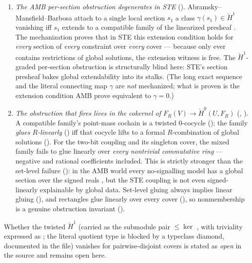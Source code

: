 \documentclass[11pt]{article}
\newcommand{\Hech}{\check H}
\begin{document}
\begin{enumerate}
\item \emph{The AMB per-section obstruction degenerates in STE}
  ().  Abramsky--Mansfield--Barbosa attach
  to a single local section $s_1$ a class $\gamma(s_1) \in \Hech^1$
  vanishing iff $s_1$ extends to a compatible family of the
  linearized presheaf \citep[Prop.~4.2]{abramsky2012cohomology}.  The
  mechanization proves that in STE this extension condition holds for
  \emph{every} section of \emph{every} constraint over \emph{every}
  cover --- because  only ever contains
  restrictions of global solutions, the extension witness is free.
  The $\Hech^1$-graded per-section obstruction is structurally blind
  here: STE's section presheaf bakes global extendability into its
  stalks.  (The long exact sequence and the literal connecting map
  $\gamma$ are \emph{not} mechanized; what is proven is the extension
  condition AMB prove equivalent to $\gamma = 0$.)
\item \emph{The obstruction that fires lives in the cokernel of
  $F_R(V) \to \Hech^0(U, F_R)$}
  (,
  ).  A compatible
  family's point-mass cochain is a twisted $0$-cocycle
  (); the family \emph{glues
  $R$-linearly} () iff that cocycle lifts to a
  formal $R$-combination of global solutions
  ().  For the two-bit coupling and
  its singleton cover, the mixed family fails to glue linearly over
  \emph{every nontrivial commutative ring} --- negative and rational
  coefficients included.  This is strictly stronger than the
  set-level failure (): in the AMB world
  every no-signalling model has a global section over the signed
  reals \citep{abramsky2011sheaf}, but the STE coupling is not even
  signed-linearly explainable by global data.  Set-level gluing
  always implies linear gluing (),
  and rectangles glue linearly over every cover
  (), so nonmembership is a genuine
  obstruction invariant
  ().
\end{enumerate}

Whether the twisted $\Hech^1$ (carried as the submodule pair
 $\le \ker$ , with
triviality expressed as ; the literal quotient
type is blocked by a typeclass diamond, documented in the file)
vanishes for pairwise-disjoint covers is stated as \emph{open} in the
source and remains open here.
\end{document}
